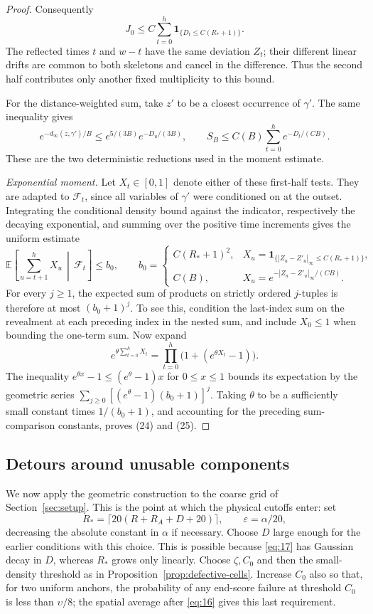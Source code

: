\begin{proof}
Consequently
\[
 J_0\le C\sum_{t=0}^{h}
             \mathbf1_{\{D_t\le C(R_*+1)\}}.
\]
The reflected times \(t\) and \(w-t\) have the same deviation
\(Z_t\); their different linear drifts are common to both skeletons
and cancel in the difference. Thus the second half contributes only
another fixed multiplicity to this bound.

For the distance-weighted sum, take \(z'\) to be a closest
occurrence of \(\gamma'\). The same inequality gives
\[
 e^{-d_\infty(z,\gamma')/B}\le
 e^{5/(3B)}e^{-D_u/(3B)},\qquad
 S_B\le C(B)\sum_{t=0}^{h}e^{-D_t/(CB)}.
\]
These are the two deterministic reductions used in the moment estimate.

\emph{Exponential moment.}
Let \(X_t\in[0,1]\) denote either of these first-half tests.
They are adapted to \(\mathcal F_t\), since all variables of
\(\gamma'\) were conditioned on at the outset. Integrating the
conditional density bound against the indicator, respectively
the decaying exponential, and summing over the positive time
increments gives the uniform estimate
\[
 \mathbb E\left[\sum_{u=t+1}^{h}X_u\,\middle|\,\mathcal F_t\right]
 \le b_0,
 \qquad
 b_0=\begin{cases}
 C(R_*+1)^2,&X_u=\mathbf1_{\{|Z_u-Z'_u|_\infty\le C(R_*+1)\}},\\
 C(B),&X_u=e^{-|Z_u-Z'_u|_\infty/(CB)}.
 \end{cases}
\]
For every \(j\ge1\), the expected sum of products on strictly
ordered \(j\)-tuples is therefore at most \((b_0+1)^j\).
To see this, condition the last-index sum on the revealment at
each preceding index in the nested sum, and include \(X_0\le1\)
when bounding the one-term sum. Now expand
\[
 e^{\theta\sum_{t=0}^{h}X_t}
 =\prod_{t=0}^{h}\bigl(1+(e^{\theta X_t}-1)\bigr).
\]
The inequality \(e^{\theta x}-1\le(e^\theta-1)x\) for
\(0\le x\le1\) bounds its expectation by the geometric series
\(\sum_{j\ge0}[(e^\theta-1)(b_0+1)]^j\).
Taking \(\theta\) to be a sufficiently small constant times
\(1/(b_0+1)\), and accounting for the preceding sum-comparison
constants, proves (24) and (25).
\end{proof}

\subsection{Detours around unusable components}

We now apply the geometric construction to the coarse grid of
Section~\ref{sec:setup}. This is the point at which the physical cutoffs
enter: set
\[
 R_* = \lceil20(R+R_A+D+20)\rceil,\qquad
 \varepsilon=\alpha/20,
\]
decreasing the absolute constant in $\alpha$ if necessary.
Choose $D$ large enough for the earlier conditions with this choice.
This is possible because \eqref{eq:17} has Gaussian decay in $D$,
whereas $R_*$ grows only linearly. Choose $\zeta,C_0$ and then the
small-density threshold as in Proposition~\ref{prop:defective-cells}.
Increase $C_0$ also so that, for two uniform anchors, the probability
of any end-score failure at threshold $C_0$ is less than $\upsilon/8$;
the spatial average after \eqref{eq:16} gives this last requirement.


